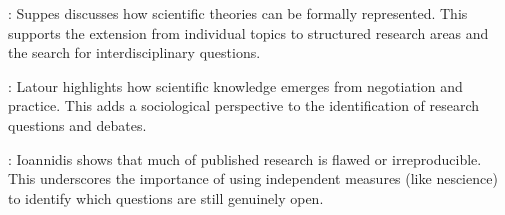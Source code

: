 \cite{suppes2002representation}: Suppes discusses how scientific theories can be formally represented. This supports the extension from individual topics to structured research areas and the search for interdisciplinary questions.

\cite{latour2013laboratory}: Latour highlights how scientific knowledge emerges from negotiation and practice. This adds a sociological perspective to the identification of research questions and debates.

\cite{ioannidis2005most}: Ioannidis shows that much of published research is flawed or irreproducible. This underscores the importance of using independent measures (like nescience) to identify which questions are still genuinely open.


